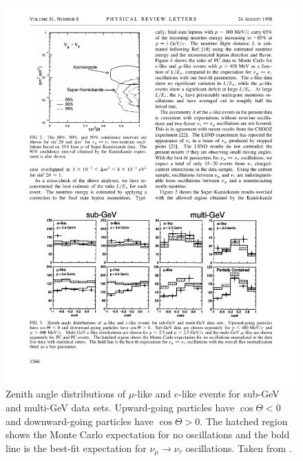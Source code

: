 \begin{figure}
  \centering
  \includegraphics{SuperKamiokandeDirection.pdf}
  \caption{Zenith angle distributions of $\mu$-like and $e$-like events for sub-GeV and multi-GeV data sets.  Upward-going particles have $\cos{\Theta} < 0$ and downward-going particles have $\cos{\Theta} > 0$.  The hatched region shows the Monte Carlo expectation for no oscillations and the bold line is the best-fit expectation for $\nu_{\mu}\rightarrow\nu_{\tau}$ oscillations.  Taken from \cite{SuperKamiokande1998}.}
  \label{fig:SuperKamiokandeDirection}
\end{figure}

